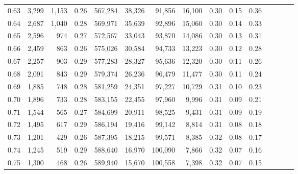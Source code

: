 \begin{tabular}{rrrcrrrrrrrrrrr}
0.63 &   3,299 &  1,153 &                                       0.26 &  567,284 &   38,326 &   91,856 &   16,100 &  0.30 &  0.15 &                         0.36 \\
0.64 &   2,687 &  1,040 &                                       0.28 &  569,971 &   35,639 &   92,896 &   15,060 &  0.30 &  0.14 &                         0.33 \\
0.65 &   2,596 &    974 &                                       0.27 &  572,567 &   33,043 &   93,870 &   14,086 &  0.30 &  0.13 &                         0.31 \\
0.66 &   2,459 &    863 &                                       0.26 &  575,026 &   30,584 &   94,733 &   13,223 &  0.30 &  0.12 &                         0.28 \\
0.67 &   2,257 &    903 &                                       0.29 &  577,283 &   28,327 &   95,636 &   12,320 &  0.30 &  0.11 &                         0.26 \\
0.68 &   2,091 &    843 &                                       0.29 &  579,374 &   26,236 &   96,479 &   11,477 &  0.30 &  0.11 &                         0.24 \\
0.69 &   1,885 &    748 &                                       0.28 &  581,259 &   24,351 &   97,227 &   10,729 &  0.31 &  0.10 &                         0.23 \\
0.70 &   1,896 &    733 &                                       0.28 &  583,155 &   22,455 &   97,960 &    9,996 &  0.31 &  0.09 &                         0.21 \\
0.71 &   1,544 &    565 &                                       0.27 &  584,699 &   20,911 &   98,525 &    9,431 &  0.31 &  0.09 &                         0.19 \\
0.72 &   1,495 &    617 &                                       0.29 &  586,194 &   19,416 &   99,142 &    8,814 &  0.31 &  0.08 &                         0.18 \\
0.73 &   1,201 &    429 &                                       0.26 &  587,395 &   18,215 &   99,571 &    8,385 &  0.32 &  0.08 &                         0.17 \\
0.74 &   1,245 &    519 &                                       0.29 &  588,640 &   16,970 &  100,090 &    7,866 &  0.32 &  0.07 &                         0.16 \\
0.75 &   1,300 &    468 &                                       0.26 &  589,940 &   15,670 &  100,558 &    7,398 &  0.32 &  0.07 &                         0.15 \\

\end{tabular}
